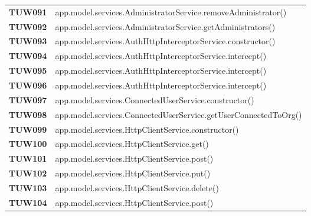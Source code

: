 \documentclass[../piano-di-qualifica.tex]{subfiles}
\begin{document}
\begin{longtable}[H]{>{\centering\bfseries}m{3cm} >{}m{13cm}}
TUW091             & app.model.services.AdministratorService.removeAdministrator\@()\\ 

TUW092            & app.model.services.AdministratorService.getAdministrators\@()\\ 



TUW093             & app.model.services.AuthHttpInterceptorService.constructor\@()\\ 

TUW094             & app.model.services.AuthHttpInterceptorService.intercept\@()\\ 
 
TUW095            & app.model.services.AuthHttpInterceptorService.intercept\@()\\ 

TUW096             & app.model.services.AuthHttpInterceptorService.intercept\@()\\ 




TUW097             & app.model.services.ConnectedUserService.constructor\@()\\ 

TUW098             & app.model.services.ConnectedUserService.getUserConnectedToOrg\@()\\ 
 


TUW099             & app.model.services.HttpClientService.constructor\@()\\ 

TUW100              & app.model.services.HttpClientService.get\@()\\ 

TUW101              & app.model.services.HttpClientService.post\@()\\ 

TUW102              & app.model.services.HttpClientService.put\@()\\ 

TUW103              & app.model.services.HttpClientService.delete\@()\\ 

TUW104              & app.model.services.HttpClientService.post\@()\\ 





\end{longtable}
\end{document}
